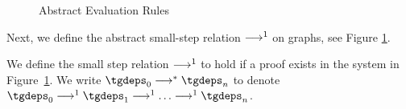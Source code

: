 \documentclass[nocopyright]{sigplanconf}
\begin{document}
\begin{figure}
    \begin{mathpar}


    \end{mathpar}
    \caption{Abstract Evaluation Rules}
    \label{fig_analysisSmallStep}
\end{figure}

Next, we define the abstract small-step relation $\smallstep$ on graphs, see Figure \ref{fig_analysisSmallStep}.

\begin{definition}
    \label{def_analysisSmallstep}
    We define the small step relation $\smallstep$ to hold if a proof exists in the system in Figure~\ref{fig_analysisSmallStep}.  We write $\tgdeps_0 \smallsteps \tgdeps_n$ to denote $\tgdeps_0 \smallstep \tgdeps_1 \smallstep \ldots \smallstep \tgdeps_n$.
\end{definition}
\end{document}
